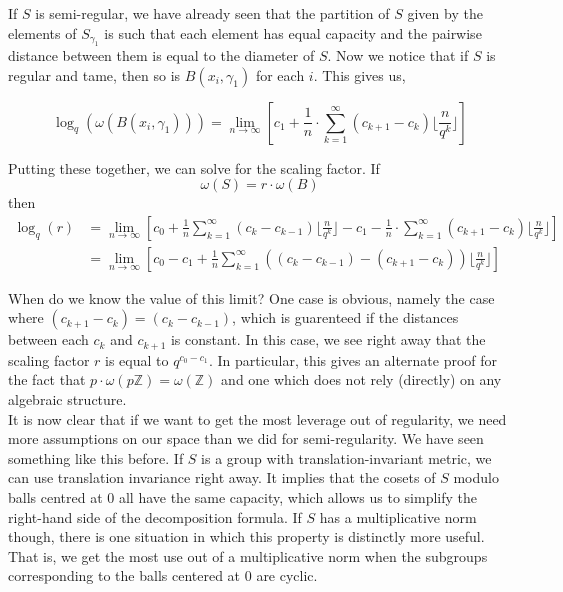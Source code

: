 If $S$ is semi-regular, we have already seen that the partition of $S$ given by the elements of $S_{\gamma_1}$ is such that each element has equal capacity and the pairwise distance between them is equal to the diameter of $S$. Now we notice that if $S$ is regular and tame, then so is $B(x_i,\gamma_1)$ for each $i$. This gives us, 

\[\log_q(\omega(B(x_i,\gamma_1))) = \lim_{n\to\infty} [c_1 + \frac{1}{n}\cdot \sum_{k=1}^{\infty} (c_{k+1} - c_{k}) \lfloor \frac{n}{q^{k}}\rfloor]\]

Putting these together, we can solve for the scaling factor.
If \[\omega(S) = r\cdot \omega(B)\] then
\begin{align*}
 \log_q(r) &= \lim_{n\to\infty} [c_0 + \frac{1}{n} \sum_{k=1}^\infty (c_k - c_{k-1}) \lfloor \frac{n}{q^k} \rfloor -  c_1 - \frac{1}{n}\cdot \sum_{k=1}^{\infty} (c_{k+1} - c_{k}) \lfloor \frac{n}{q^{k}}\rfloor] \\
& = \lim_{n\to\infty} [c_0 -c_1 + \frac{1}{n} \sum_{k=1}^\infty ((c_k - c_{k-1}) - (c_{k+1} - c_{k})) \lfloor \frac{n}{q^k} \rfloor]
\end{align*}

When do we know the value of this limit? One case is obvious, namely the case where $(c_{k+1} - c_{k}) = (c_{k} - c_{k-1})$, which is guarenteed if the distances between each $c_k$ and $c_{k+1}$ is constant. In this case, we see right away that the scaling factor $r$ is equal to $q^{c_0-c_1}$. In particular, this gives an alternate proof for the fact that $p \cdot \omega(p\mathbb{Z}) = \omega(\mathbb{Z})$ and one which does not rely (directly) on any algebraic structure. \\

It is now clear that if we want to get the most leverage out of regularity, we need more assumptions on our space than we did for semi-regularity. We have seen something like this before. If $S$ is a group with translation-invariant metric, we can use translation invariance right away. It implies that the cosets of $S$ modulo balls centred at $0$ all have the same capacity, which allows us to simplify the right-hand side of the decomposition formula. If $S$ has a multiplicative norm though, there is one situation in which this property is distinctly more useful. That is, we get the most use out of a multiplicative norm when the subgroups corresponding to the balls centered at $0$ are cyclic.\\%

